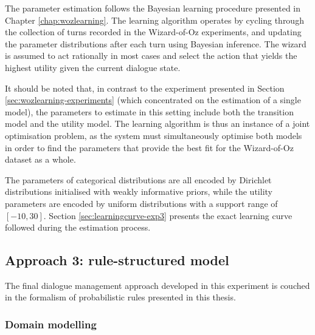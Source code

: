 The parameter estimation follows the Bayesian learning procedure presented in Chapter \ref{chap:wozlearning}. The learning algorithm operates by cycling through the collection of turns recorded in the Wizard-of-Oz experiments, and updating the parameter distributions after each turn using Bayesian inference.  The wizard is assumed to act rationally in most cases and select the action that yields the highest utility given the current dialogue state. 

It should be noted that, in contrast to the experiment presented in Section \ref{sec:wozlearning-experiments} (which concentrated on the estimation of a single model), the parameters to estimate in this setting include both the transition model and the utility model.  The learning algorithm is thus an instance of a joint optimisation problem, as the system must simultaneously optimise both models in order to find the parameters that provide the best fit for the Wizard-of-Oz dataset as a whole. 

The parameters of categorical distributions are all encoded by Dirichlet distributions initialised with weakly informative priors, while the utility parameters are encoded by uniform distributions with a support range of $[-10, 30]$.  Section \ref{sec:learningcurve-exp3} presents the exact learning curve followed during the estimation process.

\subsection{Approach 3: rule-structured model}

The final dialogue management approach developed in this experiment is couched in the formalism of probabilistic rules presented in this thesis.  


\subsubsection*{Domain modelling}

